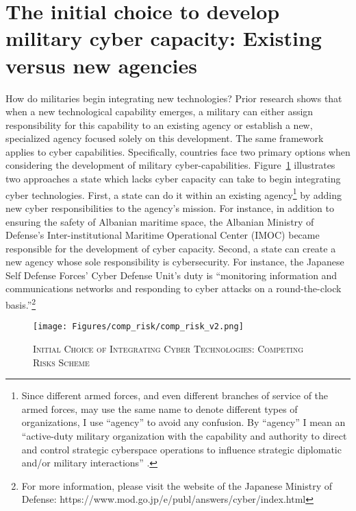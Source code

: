 \documentclass[12pt, letterpaper]{article}
\renewcommand{\baselinestretch}{1.35}
\let\oldfootnote\footnote
\renewcommand\footnote[1]{\oldfootnote{%
		\renewcommand\baselinestretch{.8}%
		\large\footnotesize\ignorespaces#1}} \addtolength{\footnotesep}{3pt}
\theoremstyle{plain}
\theoremstyle{remark}
\begin{document}
\section*{The initial choice to develop military cyber capacity: Existing versus new agencies}\label{sec:theory}


\noindent
How do militaries begin integrating new technologies? 
Prior research shows that when a new technological capability emerges, a military can either assign responsibility for this capability to an existing agency or establish a new, specialized agency focused solely on this development. The same framework applies to cyber capabilities.
Specifically, countries face two primary options when considering the development of military cyber-capabilities. Figure~\ref{fig:comp_risk} illustrates two approaches a state which lacks cyber capacity can take to begin integrating cyber technologies.
First, a state can do it within an existing agency\footnote{
	Since different armed forces, and even different branches of service of the armed forces, may use the same name to denote different types of organizations, I use ``agency'' to avoid any confusion. By ``agency'' I mean an ``active-duty military organization with the capability and authority to direct and control strategic cyberspace operations to influence strategic diplomatic and/or military interactions'' \citep[235]{Blessing2021}. 
	} 
by adding new cyber responsibilities to the agency's mission. 
For instance, in addition to ensuring the safety of Albanian maritime space, the Albanian Ministry of Defense's Inter-institutional Maritime Operational Center (IMOC) became responsible for the development of cyber capacity. Second, a state can create a new agency whose sole responsibility is cybersecurity.
For instance, the Japanese Self Defense Forces' Cyber Defense Unit's duty is ``monitoring information and communications networks and responding to cyber attacks on a round-the-clock basis.''\footnote{
	For more information, please visit the website of the Japanese Ministry of Defense: https://www.mod.go.jp/e/publ/answers/cyber/index.html
	}

\begin{figure}
	\caption{\textsc{Initial Choice of Integrating Cyber Technologies: Competing Risks Scheme}}
	\label{fig:comp_risk}
	\begin{center}
		\texttt{[image: Figures/comp\_risk/comp\_risk\_v2.png]}
	\end{center}
\end{figure}
\end{document}
